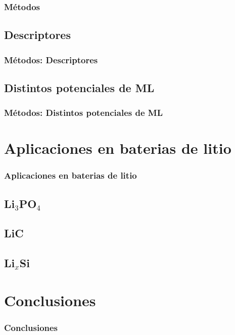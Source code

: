 \documentclass[aspectratio=169]{beamer}
\begin{document}
    \begin{frame}
        \frametitle{Métodos}
    \end{frame}

    \subsection{Descriptores}
    \begin{frame}
        \frametitle{Métodos: Descriptores}
    \end{frame}

    \subsection{Distintos potenciales de ML}
    \begin{frame}
        \frametitle{Métodos: Distintos potenciales de ML}
    \end{frame}

    \section{Aplicaciones en baterias de litio}

    \begin{frame}
        \frametitle{Aplicaciones en baterias de litio}
    \end{frame}

    \subsection{Li$_3$PO$_4$}
    \subsection{LiC}
    \subsection{Li$_x$Si}
    
    \section{Conclusiones}

    \begin{frame}
        \frametitle{Conclusiones}
    \end{frame}
\end{document}
